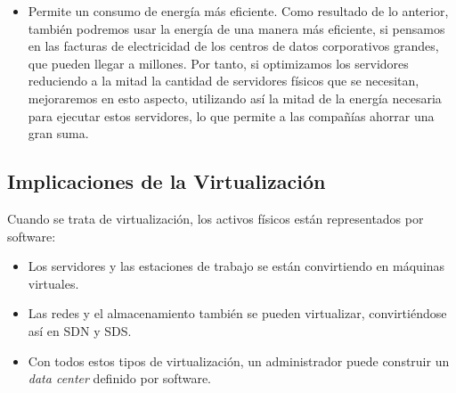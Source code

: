 \begin{itemize}
\item 
Permite un consumo de energía más eficiente. Como resultado de lo anterior, también podremos usar la energía de una manera más eficiente, si pensamos en las facturas de electricidad de los centros de datos corporativos grandes, que pueden llegar a millones. Por tanto, si optimizamos los servidores reduciendo a la mitad la cantidad de servidores físicos que se necesitan, mejoraremos en esto aspecto, utilizando así la mitad de la energía necesaria para ejecutar estos servidores, lo que permite a las compañías ahorrar una gran suma.
\end{itemize}


\subsection{Implicaciones de la Virtualización}
Cuando se trata de virtualización, los activos físicos están representados por software:
\begin{itemize}
\item 
Los servidores y las estaciones de trabajo se están convirtiendo en máquinas virtuales.
\end{itemize}
\begin{itemize}
\item 
Las redes y el almacenamiento también se pueden virtualizar, convirtiéndose así en SDN y SDS.
\end{itemize}
\begin{itemize}
\item 
Con todos estos tipos de virtualización, un administrador puede construir un \textit{data center} definido por software.
\end{itemize}

